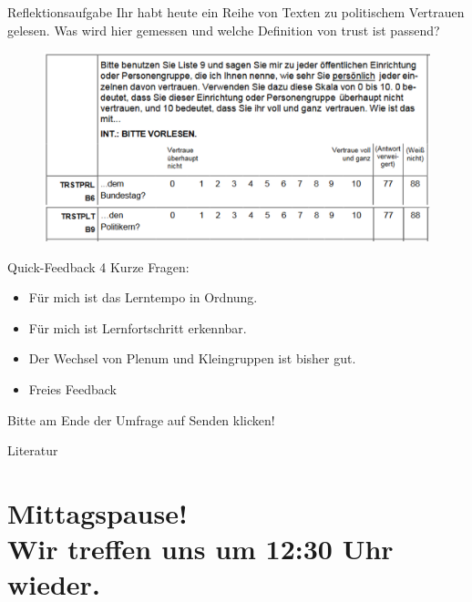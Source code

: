 \documentclass[11pt]{beamer}
\begin{document}
\begin{frame}[t]{Reflektionsaufgabe}
Ihr habt heute ein Reihe von Texten zu politischem Vertrauen gelesen. Was wird hier gemessen und welche Definition von trust ist passend?

\begin{center}
	\begin{figure}[ht]
		\includegraphics[width=\textwidth]{pics/s5-1.png}
	\end{figure}
\end{center}

\end{frame}

\begin{frame}[t]{Quick-Feedback}
4 Kurze Fragen: 

\begin{itemize}
	\item Für mich ist das Lerntempo in Ordnung.
	\item Für mich ist Lernfortschritt erkennbar.
	\item Der Wechsel von Plenum und Kleingruppen ist bisher gut.
	\item Freies Feedback
\end{itemize}

Bitte am Ende der Umfrage auf Senden klicken!

\end{frame}

\renewcommand*{\bibfont}{\scriptsize}

\begin{frame}[allowframebreaks]{Literatur}
	\nocite{*}
	\printbibliography[heading = none]
\end{frame}

\section{Mittagspause! \\ Wir treffen uns um 12:30 Uhr wieder.}
\end{document}
